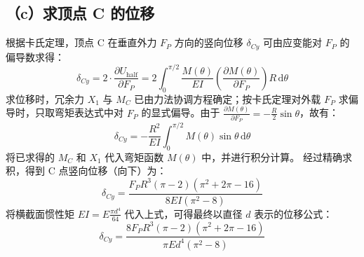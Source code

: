 \documentclass[11pt,a4paper]{ctexrep}
\newcommand{\diff}{\,\mathrm{d}}
\begin{document}
{\subsection*{（c）求顶点 C 的位移}

根据卡氏定理，顶点 C 在垂直外力 $F_P$ 方向的竖向位移 $\delta_{Cy}$ 可由应变能对 $F_P$ 的偏导数求得：
\[
    \delta_{Cy} = 2 \cdot \frac{\partial U_{\text{half}}}{\partial F_P} = 2 \int_{0}^{\pi/2} \frac{M(\theta)}{EI} \left( \frac{\partial M(\theta)}{\partial F_P} \right) R \diff \theta
\]
求位移时，冗余力 $X_1$ 与 $M_C$ 已由力法协调方程确定；按卡氏定理对外载 $F_P$ 求偏导时，只取弯矩表达式中对 $F_P$ 的显式偏导。由于 $\frac{\partial M(\theta)}{\partial F_P} = -\frac{R}{2} \sin\theta$，故有：
\[
    \delta_{Cy} = -\frac{R^2}{EI} \int_{0}^{\pi/2} M(\theta) \sin\theta \diff \theta
\]
将已求得的 $M_C$ 和 $X_1$ 代入弯矩函数 $M(\theta)$ 中，并进行积分计算。
经过精确求积，得到 C 点竖向位移（向下）为：
\[
    \delta_{Cy} = \frac{F_P R^3 (\pi - 2) (\pi^2 + 2\pi - 16)}{8EI (\pi^2 - 8)}
\]
将横截面惯性矩 $EI = E \frac{\pi d^4}{64}$ 代入上式，可得最终以直径 $d$ 表示的位移公式：
\[
    \delta_{Cy} = \frac{8 F_P R^3 (\pi - 2) (\pi^2 + 2\pi - 16)}{\pi E d^4 (\pi^2 - 8)}
\]


}
\end{document}
